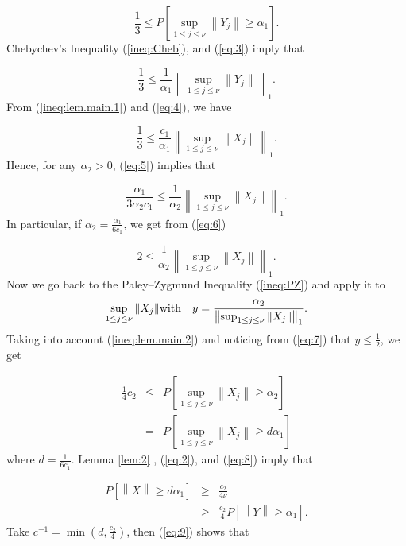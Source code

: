 \begin{equation}
\frac{1}{3} \leq P\left[\sup_{1\leq j\leq \nu} \left\|Y_j\right\| \geq
\alpha_1\right].
\label{eq:3}
\end{equation}
Chebychev's Inequality (\ref{ineq:Cheb}), and (\ref{eq:3}) imply that


\begin{equation}
\frac{1}{3} \leq \frac{1}{\alpha_1}\left\|\sup_{1\leq j\leq \nu}
\left\|Y_j\right\|\right\|_1 .
\label{eq:4}
\end{equation}
From (\ref{ineq:lem.main.1}) and (\ref{eq:4}), we have

\begin{equation}
\frac{1}{3} \leq \frac{c_1}{\alpha_1}\left\|\sup_{1\leq j\leq \nu}
\left\|X_j\right\|\right\|_1 .
\label{eq:5}
\end{equation}
Hence, for any $\alpha_2 > 0$, (\ref{eq:5}) implies that

\begin{equation}
\frac{\alpha_1}{3 \alpha_2 c_1} \leq
\frac{1}{\alpha_2}\left\|\sup_{1\leq j\leq
\nu}
\left\|X_j\right\|\right\|_1.
\label{eq:6}
\end{equation}
In particular, if $\alpha_2 = \frac{\alpha_1}{6c_1}$, we get from
(\ref{eq:6})

\begin{equation}
2\leq
\frac{1}{\alpha_2}\left\|\sup_{1\leq j\leq
\nu}
\left\|X_j\right\|\right\|_1.
\label{eq:7}
\end{equation}
Now we go back to the Paley--Zygmund Inequality (\ref{ineq:PZ}) and apply
it to
\begin{eqnarray*}
\sup_{1\leq j\leq \nu}\left\| X_j\right\| & {\rm with} &
y=\frac{\alpha_2}{\left\| \sup_{1\leq j\leq \nu}\left\| X_j\right\|
\right\|_1} .
\end{eqnarray*}
Taking into account (\ref{ineq:lem.main.2}) and noticing from
(\ref{eq:7}) that $y\leq \frac{1}{2}$, we get


\begin{eqnarray}
\frac{1}{4}c_2 & \leq & P\left[\sup_{1\leq j\leq \nu} \left\| X_j\right\|
\geq \alpha_2\right] \nonumber \\
& = & P\left[\sup_{1\leq j\leq \nu} \left\| X_j\right\|
\geq d\alpha_1\right]
\label{eq:8}
\end{eqnarray}
where $d = \frac{1}{6c_1}$.  Lemma \ref{lem:2} , (\ref{eq:2}), and
(\ref{eq:8}) imply that

\begin{eqnarray}
P\left[\left\| X\right\| \geq d\alpha_1 \right]
                    & \geq & \frac{c_2}{4\nu} \\
                    & \geq & \frac{c_2}{4}P\left[\left\| Y \right\|
                                            \geq \alpha_1\right].
\label{eq:9}
\end{eqnarray}
Take $c^{-1} = \min (d , \frac{c_2}{4})$, then (\ref{eq:9}) shows that

